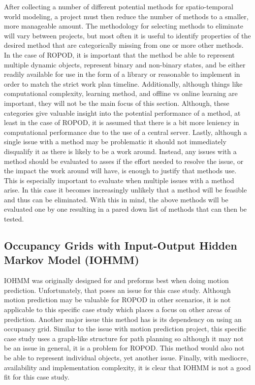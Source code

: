   After collecting a number of different potential methods for spatio-temporal world
  modeling, a project must then reduce the number of methods to a smaller, more
  manageable amount. The methodology for selecting methods to eliminate will
  vary between projects, but most often it is useful to identify properties
  of the desired method that are categorically missing from one or more other
  methods. In the case of ROPOD, it is important that the method be able to
  represent multiple dynamic objects, represent binary and non-binary states,
  and be either readily available for use in the form of a library or reasonable to
  implement in order to match the strict work plan timeline. Additionally, although
  things like computational complexity, learning method, and offline vs online
  learning are important, they will not be the main focus of this section.
  Although, these categories give valuable insight into the potential performance
  of a method, at least in the case of ROPOD,
  it is assumed that there is a bit more leniency in computational performance
  due to the use of a central server.
  Lastly, although a single issue with a method may be problematic it should
  not immediately disqualify it as there is likely to be a work around. Instead,
  any issues with a method should be evaluated to asses if the effort needed
  to resolve the issue, or the impact the work around will have, is enough to
  justify that methods use. This is especially important to evaluate when
  multiple issues with a method arise. In this case it becomes increasingly
  unlikely that a method will be feasible and thus can be eliminated.
  With this in mind, the above methods will be
  evaluated one by one resulting in a pared down list of methods that can
  then be tested. \\

  \subsection { Occupancy Grids with Input-Output Hidden Markov Model (IOHMM) }
  IOHMM was originally designed for and preforms best when doing motion prediction.
  Unfortunately, that poses an issue for this case study. Although motion prediction
  may be valuable for ROPOD in other scenarios, it is not applicable to this specific case study
  which places a focus on other areas of prediction.
  Another major issue this method has is its
  dependency on using an occupancy grid. Similar to the issue with motion
  prediction project, this specific case study uses a graph-like structure for path
  planning so although it may not be an issue in general, it is a problem for ROPOD. This method would also not be able to represent individual objects,
  yet another issue. Finally, with mediocre, availability and
  implementation complexity, it is clear that IOHMM is not a good fit for this
  case study.

